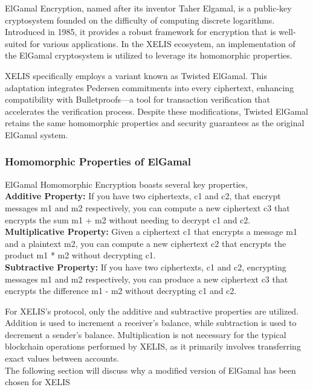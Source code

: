 \documentclass[12pt,a4paper,twocolumn]{article}
\begin{document}
ElGamal Encryption, named after its inventor Taher Elgamal, is a public-key cryptosystem founded on the difficulty of computing discrete logarithms. Introduced in 1985, it provides a robust framework for encryption that is well-suited for various applications. In the XELIS ecosystem, an implementation of the ElGamal cryptosystem is utilized to leverage its homomorphic properties.

XELIS specifically employs a variant known as Twisted ElGamal. This adaptation integrates Pedersen commitments into every ciphertext, enhancing compatibility with Bulletproofs—a tool for transaction verification that accelerates the verification process. Despite these modifications, Twisted ElGamal retains the same homomorphic properties and security guarantees as the original ElGamal system.\\

\subsubsection{Homomorphic Properties of ElGamal}

ElGamal Homomorphic Encryption boasts several key properties,\\

\textbf{Additive Property:} If you have two ciphertexts, c1 and c2, that encrypt messages m1 and m2 respectively, you can compute a new ciphertext c3 that encrypts the sum m1 + m2 without needing to decrypt c1 and c2.\\

\textbf{Multiplicative Property:} Given a ciphertext c1 that encrypts a message m1 and a plaintext m2, you can compute a new ciphertext c2 that encrypts the product m1 * m2 without decrypting c1.\\

\textbf{Subtractive Property:} If you have two ciphertexts, c1 and c2, encrypting messages m1 and m2 respectively, you can produce a new ciphertext c3 that encrypts the difference m1 - m2 without decrypting c1 and c2.

For XELIS's protocol, only the additive and subtractive properties are utilized. Addition is used to increment a receiver's balance, while subtraction is used to decrement a sender's balance. Multiplication is not necessary for the typical blockchain operations performed by XELIS, as it primarily involves transferring exact values between accounts.\\ 

The following section will discuss why a modified version of ElGamal has been chosen for XELIS
\end{document}
